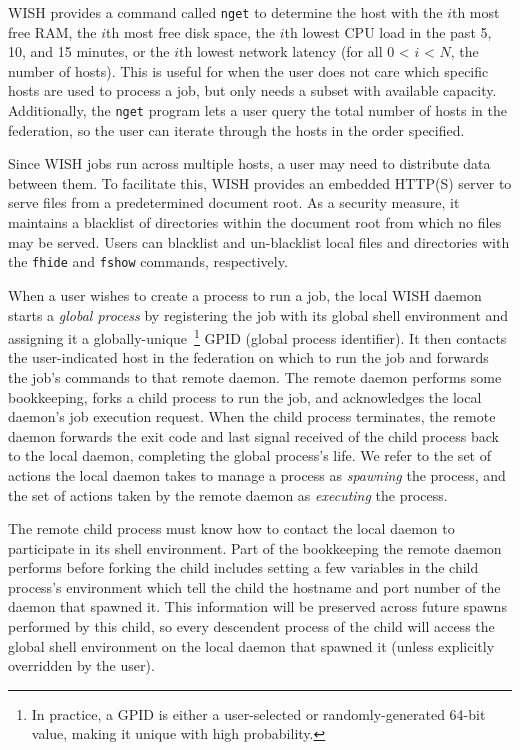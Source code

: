 WISH provides a command called \texttt{nget} to determine the host with the
$i$th most free RAM, the $i$th most free disk space, the $i$th lowest CPU load
in the past 5, 10, and 15 minutes, or  the $i$th lowest network latency (for
all 0 < $i$ < $N$, the number of hosts).  This is useful for when the user
does not care which specific hosts are used to process a job, but only needs a
subset with available capacity.  Additionally, the \texttt{nget} program lets
a user query the total number of hosts in the federation, so the user can iterate
through the hosts in the order specified.


Since WISH jobs run across multiple hosts, a user may need to distribute data
between them.  To facilitate this, WISH provides an embedded HTTP(S) server to
serve files from a predetermined document root.  As a security measure, it
maintains a blacklist of directories within the document root from which no
files may be served.  Users can blacklist and un-blacklist local files and
directories with the \texttt{fhide} and \texttt{fshow} commands, respectively.


When a user wishes to create a process to run a job, the local WISH daemon
starts a \textit{global process} by registering the job with its global shell
environment and assigning it a globally-unique~\footnote{In practice, a GPID
is either a user-selected or randomly-generated 64-bit value, making it unique
with high probability.} GPID (global process identifier).  It then contacts
the user-indicated host in the federation on which to run the job and forwards
the job's commands to that remote daemon.  The remote daemon performs some
bookkeeping, forks a child process to run the job, and acknowledges the local
daemon's job execution request.  When the child process terminates, the remote
daemon forwards the exit code and last signal received of the child process
back to the local daemon, completing the global process's life.  We refer to
the set of actions the local daemon takes to manage a process as
\textit{spawning} the process, and the set of actions taken by the remote
daemon as \textit{executing} the process.

The remote child process must know how to contact the local daemon to
participate in its shell environment.  Part of the bookkeeping the remote
daemon performs before forking the child includes setting a few variables in
the child process's environment which tell the child the hostname and port
number of the daemon that spawned it.  This information will be preserved
across future spawns performed by this child, so every descendent process of
the child will access the global shell environment on the local daemon that
spawned it (unless explicitly overridden by the user).

